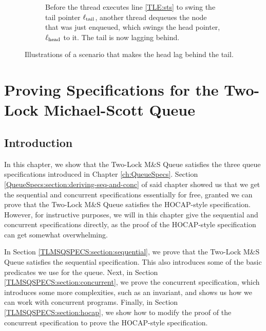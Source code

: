 \documentclass[a4paper, 10pt]{report}
\theoremstyle{definition}
\newcommand{\msq}{M\&S Queue}
\newcommand{\tlmsq}{Two-Lock \msq{}}
\newcommand{\locN}[1]{\loc_{\mathrm{#1}}}
\newcommand{\lochead}{\locN{head}}
\newcommand{\loctail}{\locN{tail}}
\newcommand{\node}{x}
\begin{document}
\begin{figure}
\begin{subfigure}{\textwidth}
\begin{adjustbox}{center}
    \end{adjustbox}
    \caption{Before the thread executes line \ref{TLE:sts} to swing the tail pointer $\loctail$, another thread dequeues the node that was just enqueued, which swings the head pointer, $\lochead$ to it. The tail is now lagging behind.}
    \label{TLMSQ:impl:figure:lag:c}
  \end{subfigure}
  \caption{Illustrations of a scenario that makes the head lag behind the tail.}
  \label{TLMSQ:impl:figure:lag}
\end{figure}


\chapter{Proving Specifications for the Two-Lock Michael-Scott Queue}
\label{ch:TLMSQSPECS}

\section{Introduction}
\label{TLMSQSPECS:section:introduction}

In this chapter, we show that the \tlmsq{} satisfies the three queue specifications introduced in Chapter \ref{ch:QueueSpecs}. Section \ref{QueueSpecs:section:deriving-seq-and-conc} of said chapter showed us that we get the sequential and concurrent specifications essentially for free, granted we can prove that the \tlmsq{} satisfies the HOCAP-style specification. However, for instructive purposes, we will in this chapter give the sequential and concurrent specifications directly, as the proof of the HOCAP-style specification can get somewhat overwhelming.

In Section \ref{TLMSQSPECS:section:sequential}, we prove that the \tlmsq{} satisfies the sequential specification. This also introduces some of the basic predicates we use for the queue. Next, in Section \ref{TLMSQSPECS:section:concurrent}, we prove the concurrent specification, which introduces some more complexities, such as an invariant, and shows us how we can work with concurrent programs. Finally, in Section \ref{TLMSQSPECS:section:hocap}, we show how to modify the proof of the concurrent specification to prove the HOCAP-style specification.
\end{document}
